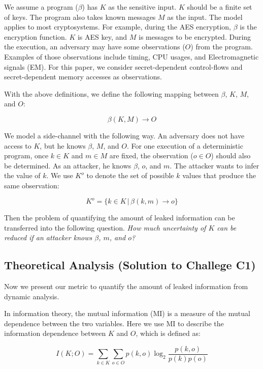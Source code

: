 We assume a program ($\beta$) has $K$ as the sensitive input. $K$ should be a
finite set of keys. The program also takes known messages $M$ as the input. The
model applies to most cryptosystems. For example, during the AES encryption,
$\beta$ is the encryption function. $K$ is AES key, and $M$ is messages to be
encrypted. During the execution, an adversary may have some observations ($O$)
from the program. Examples of those observations include timing, CPU usages, and
Electromagnetic signals (EM). For this paper, we consider secret-dependent
control-flows and secret-dependent memory accesses as observations.

With the above definitions, we define the following mapping between $\beta$,
$K$, $M$, and $O$:

\begin{displaymath}
    \beta(K, M) \rightarrow O
\end{displaymath}

We model a side-channel with the following way. An adversary does not have
access to $K$, but he knows $\beta$, $M$, and $O$. For one execution of a
deterministic program, once $k \in K$ and $m \in M$ are fixed, the observation
($o \in O$) should also be determined. As an attacker, he knows $\beta$, $o$,
and $m$. The attacker wants to infer the value of $k$. We use $K^o$ to denote
the set of possible $k$ values that produce the same observation:

\begin{displaymath}
    K^o = \{ k \in K \, |\, \beta(k, m) \rightarrow o\}
\end{displaymath}

Then the problem of quantifying the amount of leaked information can be
transferred into the following question.
\emph{How much uncertainty of $K$ can be reduced if an attacker knows $\beta$, $m$, and $o$?}

\subsection{Theoretical Analysis \textbf{(Solution to Challege C1)}}
Now we present our metric to quantify the amount of leaked information from
dynamic analysis.

In information theory, the mutual information (MI) is a measure of the mutual
dependence between the two variables. Here we use MI to describe the information
dependence between $K$ and $O$, which is defined as:

\begin{equation} \label{eq:1}
    I(K;O) = \sum_{k {\in} K}{\sum_{o {\in} O}{p(k, o)\log_2\frac{p(k, o)}{p(k)p(o)}}}
\end{equation}


